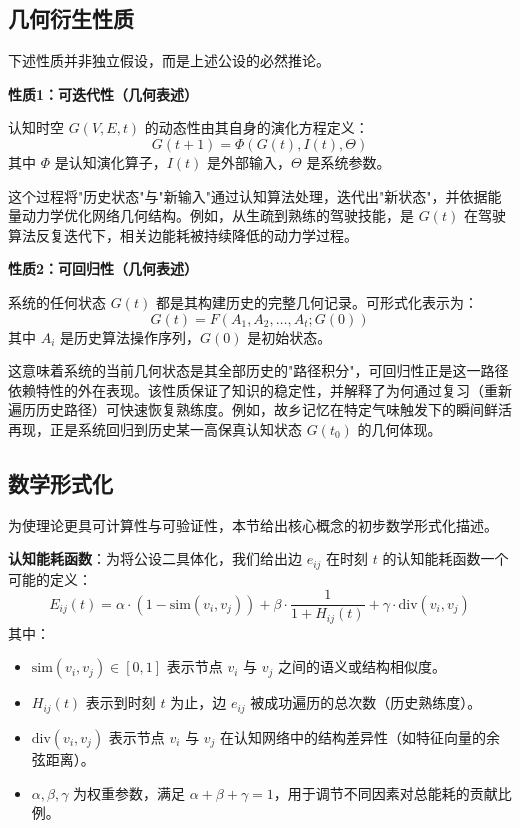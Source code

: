 \documentclass[12pt,a4paper]{article}
\begin{document}
\subsection{几何衍生性质}

下述性质并非独立假设，而是上述公设的必然推论。

\textbf{性质1：可迭代性（几何表述）}

认知时空 $G(V,E,t)$ 的动态性由其自身的演化方程定义：
\begin{equation}
G(t+1) = \Phi(G(t), I(t), \Theta)
\end{equation}
其中 $\Phi$ 是认知演化算子，$I(t)$ 是外部输入，$\Theta$ 是系统参数。

这个过程将"历史状态"与"新输入"通过认知算法处理，迭代出"新状态"，并依据能量动力学优化网络几何结构。例如，从生疏到熟练的驾驶技能，是 $G(t)$ 在驾驶算法反复迭代下，相关边能耗被持续降低的动力学过程。

\textbf{性质2：可回归性（几何表述）}

系统的任何状态 $G(t)$ 都是其构建历史的完整几何记录。可形式化表示为：
\begin{equation}
G(t) = F(A_1, A_2, \ldots, A_t; G(0))
\end{equation}
其中 $A_i$ 是历史算法操作序列，$G(0)$ 是初始状态。

这意味着系统的当前几何状态是其全部历史的"路径积分"，可回归性正是这一路径依赖特性的外在表现。该性质保证了知识的稳定性，并解释了为何通过复习（重新遍历历史路径）可快速恢复熟练度。例如，故乡记忆在特定气味触发下的瞬间鲜活再现，正是系统回归到历史某一高保真认知状态 $G(t_0)$ 的几何体现。

\subsection{数学形式化}
为使理论更具可计算性与可验证性，本节给出核心概念的初步数学形式化描述。

\textbf{认知能耗函数}：为将公设二具体化，我们给出边 $e_{ij}$ 在时刻 $t$ 的认知能耗函数一个可能的定义：
\begin{equation}
E_{ij}(t) = \alpha \cdot (1 - \text{sim}(v_i, v_j)) + \beta \cdot \frac{1}{1 + H_{ij}(t)} + \gamma \cdot \text{div}(v_i, v_j)
\label{eq:energy_function}
\end{equation}
其中：
\begin{itemize}
    \item $\text{sim}(v_i, v_j) \in [0, 1]$ 表示节点 $v_i$ 与 $v_j$ 之间的语义或结构相似度。
    \item $H_{ij}(t)$ 表示到时刻 $t$ 为止，边 $e_{ij}$ 被成功遍历的总次数（历史熟练度）。
    \item $\text{div}(v_i, v_j)$ 表示节点 $v_i$ 与 $v_j$ 在认知网络中的结构差异性（如特征向量的余弦距离）。
    \item $\alpha, \beta, \gamma$ 为权重参数，满足 $\alpha + \beta + \gamma = 1$，用于调节不同因素对总能耗的贡献比例。
\end{itemize}
\end{document}
